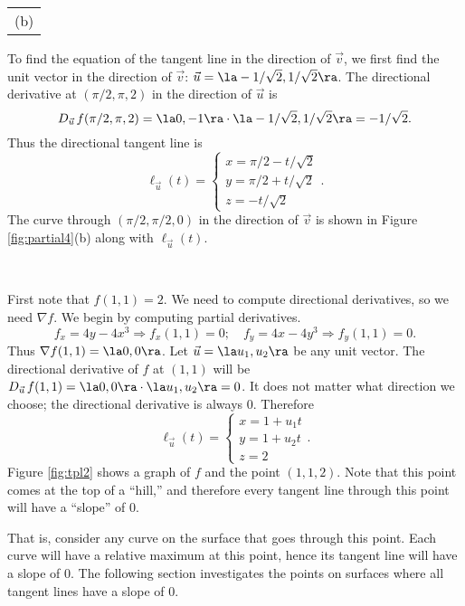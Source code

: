 {{\begin{tabular}{c}
(b)
\end{tabular}
}
To find the equation of the tangent line in the direction of $\vec v$, we first find the unit vector in the direction of $\vec v$: $\vec u = \la -1/\sqrt{2},1/\sqrt{2}\ra$. The directional derivative at $(\pi/2,\pi,2)$ in the direction of $\vec u$ is 
\[
D_{\vec u\,}f(\pi/2,\pi,2) = \la 0,-1\ra \cdot \la -1/\sqrt{2},1/\sqrt 2\ra = -1/\sqrt 2.
\]
Thus the directional tangent line is 
\[
\ell_{\vec u}(t) = \left\{\begin{array}{l} x= \pi/2 -t/\sqrt{2}\\ y = \pi/2 + t/\sqrt{2} \\ z= -t/\sqrt{2}\end{array}\right. .
\]
The curve through $(\pi/2,\pi/2,0)$ in the direction of $\vec v$ is shown in Figure \ref{fig:partial4}(b) along with $\ell_{\vec u}(t)$.
}\\

{First note that $f(1,1) = 2$. We need to compute directional derivatives, so we need $\nabla f$. We begin by computing partial derivatives.
\[
f_x = 4y-4x^3 \Rightarrow f_x(1,1) = 0;\quad f_y = 4x-4y^3\Rightarrow f_y(1,1) = 0.
\]
Thus $\nabla f(1,1) = \la 0,0\ra$. Let $\vec u = \la u_1,u_2\ra$ be any unit vector. The directional derivative of $f$ at $(1,1)$ will be $D_{\vec u\,}f(1,1) = \la 0,0\ra\cdot \la u_1,u_2\ra = 0$. It does not matter what direction we choose; the directional derivative is always 0. Therefore
\[
\ell_{\vec u}(t) = \left\{\begin{array}{l} x= 1 +u_1t\\ y = 1+ u_2 t\\ z= 2\end{array}\right..
\]
Figure \ref{fig:tpl2} shows a graph of $f$ and the point $(1,1,2)$. Note that this point comes at the top of a ``hill,'' and therefore every tangent line through this point will have a ``slope'' of 0. 


That is, consider any curve on the surface that goes through this point. Each curve will have a relative maximum at this point, hence its tangent line will have a slope of 0. The following section investigates the points on surfaces where all tangent lines have a slope of 0.
}\\
\pagebreak

